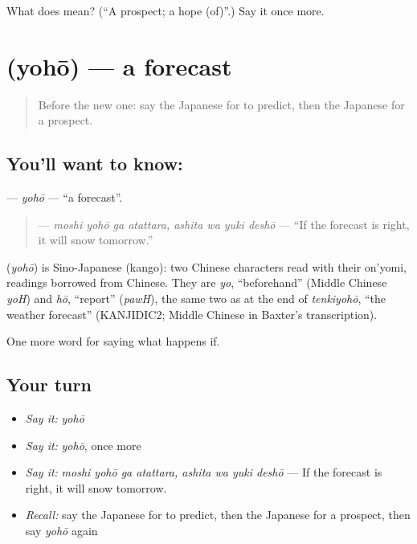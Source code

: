 \begin{tcolorbox}[breakable,colback=teal!4,colframe=teal!35!black,title={Before you move on}]
What does  mean? (\textquotedblleft{}A prospect; a hope (of)\textquotedblright{}.) Say it once more.
\end{tcolorbox}
\section[\texorpdfstring{\ja{よほう} (yohō)}{よほう (yohō)}]{ (yohō) — a forecast}

\label{lesson:JA-C514-yohou}



\begin{quote}
Before the new one: say the Japanese for to predict, then the Japanese for a prospect.
\end{quote}

\subsection*{You'll want to know: }
\textbf{} — \emph{yohō} — \textquotedblleft{}a forecast\textquotedblright{}.

\begin{quote}
\textbf{   } — \emph{moshi yohō ga atattara, ashita wa yuki deshō} — \textquotedblleft{}If the forecast is right, it will snow tomorrow.\textquotedblright{}
\end{quote}

\begin{cousinweb}
\textbf{} (\emph{yohō}) is Sino-Japanese (kango): two Chinese characters read with their on'yomi, readings borrowed from Chinese. They are \emph{yo}, \textquotedblleft{}beforehand\textquotedblright{} (Middle Chinese \emph{yoH}) and \emph{hō}, \textquotedblleft{}report\textquotedblright{} (\emph{pawH}), the same two as at the end of \emph{tenkiyohō}, \textquotedblleft{}the weather forecast\textquotedblright{} (KANJIDIC2; Middle Chinese in Baxter's transcription).
\end{cousinweb}

\begin{grammarlens}[title={What you've built}]
One more word for saying what happens if.
\end{grammarlens}

\subsection*{Your turn}
\begin{itemize}
\raggedright
  \item \emph{Say it:} \emph{yohō}
  \item \emph{Say it:} \emph{yohō}, once more
  \item \emph{Say it:} \emph{moshi yohō ga atattara, ashita wa yuki deshō} — If the forecast is right, it will snow tomorrow.
  \item \emph{Recall:} say the Japanese for to predict, then the Japanese for a prospect, then say \emph{yohō} again
\end{itemize}

